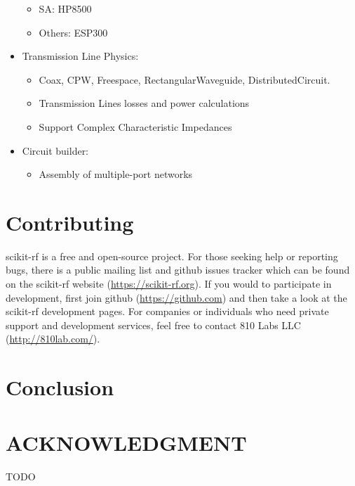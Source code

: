 \documentclass{IEEEjmw}
\begin{document}
\begin{itemize}
\begin{itemize}
		\item SA: HP8500
		\item Others: ESP300
	\end{itemize}
\item	Transmission Line Physics:
	\begin{itemize}
		\item Coax, CPW, Freespace, RectangularWaveguide, DistributedCircuit.
		\item Transmission Lines losses and power calculations
		\item Support Complex Characteristic Impedances
	\end{itemize}
\item Circuit builder:
	\begin{itemize}
		\item Assembly of multiple-port networks
	\end{itemize}
\end{itemize}

\section{Contributing}
scikit-rf is a free and open-source project. For those seeking help or reporting bugs, there is a public mailing list and github issues tracker which can be found on the scikit-rf website (\url{https://scikit-rf.org}). If you would to participate in development, first join github (\url{https://github.com}) and then take a look at the scikit-rf development pages. For companies or individuals who need private support and development services, feel free to contact 810 Labs LLC (\url{http://810lab.com/}).

\section{Conclusion}

\section*{ACKNOWLEDGMENT}
TODO




\end{document}

